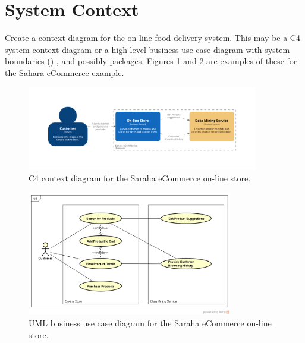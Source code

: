 \documentclass{csse4400}
\begin{document}
\newpage
\section{System Context}
Create a context diagram for the on-line food delivery system.
This may be a C4 system context diagram or a high-level business use case diagram with system boundaries
() \cite{uml}, and possibly packages.
Figures \ref{fig:c4_context} and \ref{fig:uml_context} are examples of these for the Sahara eCommerce example.

\begin{figure}[h!]
    \centering
    \includegraphics[trim=195 195 198 195,clip,width=0.9\textwidth]{../../notes/views/images/c4/context_diagram.png}
    \caption{C4 context diagram for the Saraha eCommerce on-line store.}
    \label{fig:c4_context}
\end{figure}

\begin{figure}[h!]
    \centering
    \includegraphics[trim=39 38 23 49,clip,width=0.8\textwidth]{images/uml-context.png}
    \caption{UML business use case diagram for the Saraha eCommerce on-line store.}
    \label{fig:uml_context}
\end{figure}

\end{document}
